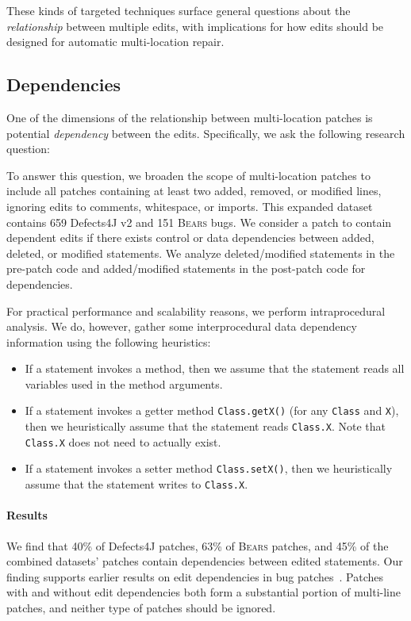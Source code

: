 \documentclass[10pt, conference]{IEEEtran}
\newcommand\bears{\textsc{Bears}\xspace}
\begin{document}
These kinds of targeted techniques surface general questions about the
\emph{relationship} between multiple edits, with implications for how edits
should be designed for automatic multi-location repair. 

\subsection{Dependencies}

One of the dimensions of the relationship between multi-location patches is potential
\emph{dependency} between the edits. Specifically, we ask the following research question:

To answer this question, we broaden the scope of multi-location patches to 
include all patches containing at least two added, removed, or modified lines, 
ignoring edits to comments, whitespace, or imports.
This expanded dataset contains 659 Defects4J v2 and 151 \bears bugs.
We consider a patch to contain dependent edits if there exists 
control or data dependencies between added, deleted, or modified statements.
We analyze deleted/modified statements in the pre-patch code 
and added/modified statements in the post-patch code for dependencies.
  
For practical performance and scalability reasons, 
we perform intraprocedural analysis. 
We do, however, gather some interprocedural data dependency information 
using the following heuristics:
\begin{itemize}
	\item If a statement invokes a method, then we assume that
	the statement reads all variables used in the method arguments.
	\item If a statement invokes a getter method \texttt{Class.getX()} 
	(for any \texttt{Class} and \texttt{X}), then we heuristically 
	assume that the statement reads \texttt{Class.X}. 
	Note that \texttt{Class.X} does not need to actually exist.
	\item If a statement invokes a setter method \texttt{Class.setX()}, 
	then we heuristically assume that the statement writes to \texttt{Class.X}. 
\end{itemize}

\paragraph{Results}

We find that 40\% of Defects4J patches, 63\% of \bears patches, 
and 45\% of the combined datasets' patches contain dependencies 
between edited statements.
Our finding supports earlier results on edit dependencies in 
bug patches~\cite{zhong2015}.
Patches with and without edit dependencies both form a substantial
portion of multi-line patches,
and neither type of patches should be ignored.
\end{document}
